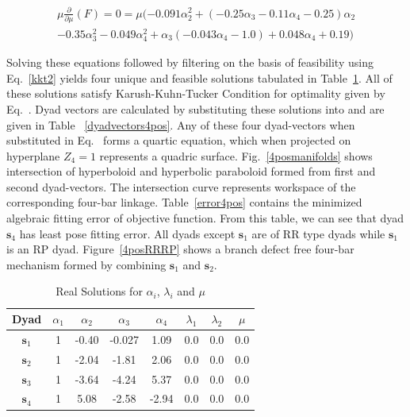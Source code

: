\begin{equation}
\begin{array}{c}
\mu\frac{\partial}{\partial \mu}(F) = 0 =\mu(-0.091 \alpha_2^2+(-0.25 \alpha_3-0.11 \alpha_4-0.25) \alpha_2\\-0.35 \alpha_3^2-0.049 \alpha_4^2+\alpha_3 (-0.043 \alpha_4-1.0)+0.048 \alpha_4+0.19)
\end{array}
\end{equation}

Solving these equations followed by filtering on the basis of feasibility using Eq.~\ref{kkt2} yields four unique and feasible solutions tabulated in Table~\ref{alphasol}. All of these solutions satisfy Karush-Kuhn-Tucker Condition for optimality given by Eq.~. Dyad vectors are calculated by substituting these solutions into  and are given in Table ~\ref{dyadvectors4pos}. Any of these four dyad-vectors when substituted in Eq.~ forms a quartic equation, which when projected on hyperplane $Z_4 = 1$ represents a quadric surface. Fig.~\ref{4posmanifolds} shows intersection of hyperboloid and hyperbolic paraboloid  formed from first and second dyad-vectors. The intersection curve represents workspace of the corresponding four-bar linkage. Table~\ref{error4pos} contains the minimized algebraic fitting error of objective function. From this table, we can see that dyad $\textbf{s}_4$ has least pose fitting error. All dyads except $\textbf{s}_1$ are of RR type dyads while $\textbf{s}_1$ is an RP dyad. Figure~\ref{4posRRRP} shows a branch defect free four-bar mechanism formed by combining $\textbf{s}_1$ and $\textbf{s}_2$.

\begin{table}
\caption{Real Solutions for $\alpha_i$, $\lambda_i$ and $\mu$}
\centering
\label{alphasol}
\begin{tabular}{cccccccc}
\hline
Dyad &$\alpha_1$&$\alpha_2$ & $\alpha_3$& $\alpha_4$& $\lambda_1$& $\lambda_2$& $\mu$\\
\hline
$\textbf{s}_1$  & 1 & -0.40 & -0.027 & 1.09 & 0.0 & 0.0 & 0.0 \\
$\textbf{s}_2$ & 1 &  -2.04 & -1.81 & 2.06 & 0.0 & 0.0 & 0.0 \\
$\textbf{s}_3$ & 1 &-3.64 & -4.24 & 5.37 & 0.0 & 0.0 & 0.0 \\
$\textbf{s}_4$ & 1 & 5.08 & -2.58 & -2.94  & 0.0 & 0.0 & 0.0 \\
\hline
\end{tabular}
\end{table}

